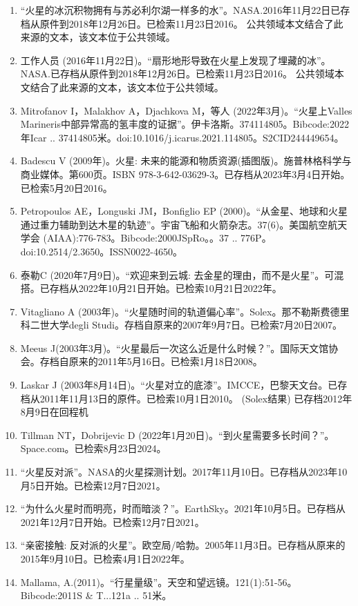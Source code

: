 \begin{enumerate}
\item “火星的冰沉积物拥有与苏必利尔湖一样多的水”。NASA.2016年11月22日已存档从原件到2018年12月26日。已检索11月23日2016。 公共领域本文结合了此来源的文本，该文本位于公共领域。
\item 工作人员 (2016年11月22日)。“扇形地形导致在火星上发现了埋藏的冰”。NASA.已存档从原件到2018年12月26日。已检索11月23日2016。 公共领域本文结合了此来源的文本，该文本位于公共领域。
\item Mitrofanov I，Malakhov A，Djachkova M，等人 (2022年3月)。“火星上Valles Marineris中部异常高的氢丰度的证据”。伊卡洛斯。374114805。Bibcode:2022年Icar .. 37414805米。doi:10.1016/j.icarus.2021.114805。S2CID244449654。 
\item Badescu V (2009年)。火星: 未来的能源和物质资源(插图版)。施普林格科学与商业媒体。第600页。ISBN 978-3-642-03629-3。已存档从2023年3月4日开始。已检索5月20日2016。
\item Petropoulos AE，Longuski JM，Bonfiglio EP (2000)。“从金星、地球和火星通过重力辅助到达木星的轨迹”。宇宙飞船和火箭杂志。37(6)。美国航空航天学会 (AIAA):776-783。Bibcode:2000JSpRo。。37 .. 776P。doi:10.2514/2.3650。ISSN0022-4650。 
\item 泰勒C (2020年7月9日)。“欢迎来到云城: 去金星的理由，而不是火星”。可混搭。已存档从2022年10月21日开始。已检索10月21日2022年。
\item Vitagliano A (2003年)。“火星随时间的轨道偏心率”。Solex。那不勒斯费德里科二世大学degli Studi。存档自原来的2007年9月7日。已检索7月20日2007。
\item Meeus J(2003年3月)。“火星最后一次这么近是什么时候？”。国际天文馆协会。存档自原来的2011年5月16日。已检索1月18日2008。
\item Laskar J (2003年8月14日)。“火星对立的底漆”。IMCCE，巴黎天文台。已存档从2011年11月13日的原件。已检索10月1日2010。 (Solex结果) 已存档2012年8月9日在回程机
\item Tillman NT，Dobrijevic D (2022年1月20日)。“到火星需要多长时间？”。Space.com。已检索8月23日2024。
\item “火星反对派”。NASA的火星探测计划。2017年11月10日。已存档从2023年10月5日开始。已检索12月7日2021。
\item “为什么火星时而明亮，时而暗淡？”。EarthSky。2021年10月5日。已存档从2021年12月7日开始。已检索12月7日2021。
\item “亲密接触: 反对派的火星”。欧空局/哈勃。2005年11月3日。已存档从原来的2015年9月10日。已检索4月1日2022年。
\item Mallama, A.(2011)。“行星量级”。天空和望远镜。121(1):51-56。Bibcode:2011S & T...121a .. 51米。

\end{enumerate}
